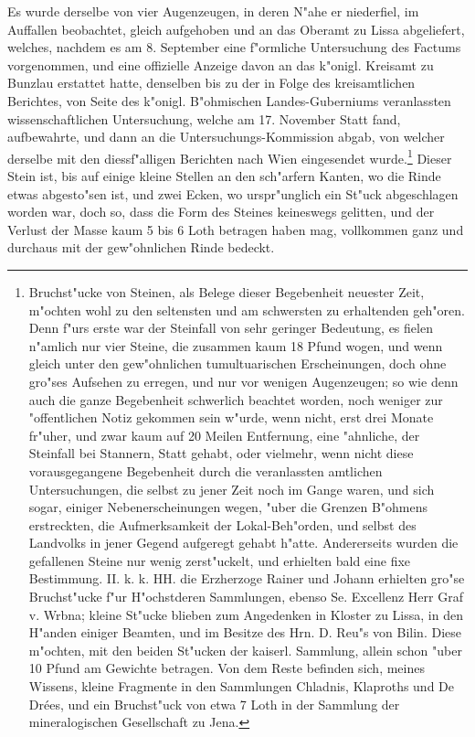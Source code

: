 \documentclass[a4paper, 11pt, oneside, german]{article}
\begin{document}
Es wurde derselbe von vier Augenzeugen, in deren N"ahe er niederfiel, im Auffallen beobachtet, gleich aufgehoben und an das Oberamt zu Lissa abgeliefert, welches, nachdem es am 8. September eine f"ormliche Untersuchung des Factums vorgenommen, und eine offizielle Anzeige davon an das k"onigl. Kreisamt zu Bunzlau erstattet hatte, denselben bis zu der in Folge des kreisamtlichen Berichtes, von Seite des k"onigl. B"ohmischen Landes-Guberniums veranlassten wissenschaftlichen Untersuchung, welche am 17. November Statt fand, aufbewahrte, und dann an die Untersuchungs-Kommission abgab, von welcher derselbe mit den diessf"alligen Berichten nach Wien eingesendet wurde.\footnote{Bruchst"ucke von Steinen, als Belege dieser Begebenheit neuester Zeit, m"ochten wohl zu den seltensten und am schwersten zu erhaltenden geh"oren. Denn f"urs erste war der Steinfall von sehr geringer Bedeutung, es fielen n"amlich nur vier Steine, die zusammen kaum 18 Pfund wogen, und wenn gleich unter den gew"ohnlichen tumultuarischen Erscheinungen, doch ohne gro"ses Aufsehen zu erregen, und nur vor wenigen Augenzeugen; so wie denn auch die ganze Begebenheit schwerlich beachtet worden, noch weniger zur "offentlichen Notiz gekommen sein w"urde, wenn nicht, erst drei Monate fr"uher, und zwar kaum auf 20 Meilen Entfernung, eine "ahnliche, der Steinfall bei Stannern, Statt gehabt, oder vielmehr, wenn nicht diese vorausgegangene Begebenheit durch die veranlassten amtlichen Untersuchungen, die selbst zu jener Zeit noch im Gange waren, und sich sogar, einiger Nebenerscheinungen wegen, "uber die Grenzen B"ohmens erstreckten, die Aufmerksamkeit der Lokal-Beh"orden, und selbst des Landvolks in jener Gegend aufgeregt gehabt h"atte. Andererseits wurden die gefallenen Steine nur wenig zerst"uckelt, und erhielten bald eine fixe Bestimmung. II. k. k. HH. die Erzherzoge Rainer und Johann erhielten gro"se Bruchst"ucke f"ur H"ochstderen Sammlungen, ebenso Se. Excellenz Herr Graf v. Wrbna; kleine St"ucke blieben zum Angedenken in Kloster zu Lissa, in den H"anden einiger Beamten, und im Besitze des Hrn. D. Reu"s von Bilin. Diese m"ochten, mit den beiden St"ucken der kaiserl. Sammlung, allein schon "uber 10 Pfund am Gewichte betragen. Von dem Reste befinden sich, meines Wissens, kleine Fragmente in den Sammlungen Chladnis, Klaproths und De Drées, und ein Bruchst"uck von etwa 7 Loth in der Sammlung der mineralogischen Gesellschaft zu Jena.} Dieser Stein ist, bis auf einige kleine Stellen an den sch"arfern Kanten, wo die Rinde etwas abgesto"sen ist, und zwei Ecken, wo urspr"unglich ein St"uck abgeschlagen worden war, doch so, dass die Form des Steines keineswegs gelitten, und der Verlust der Masse kaum 5 bis 6 Loth betragen haben mag, vollkommen ganz und durchaus mit der gew"ohnlichen Rinde bedeckt.
\end{document}
